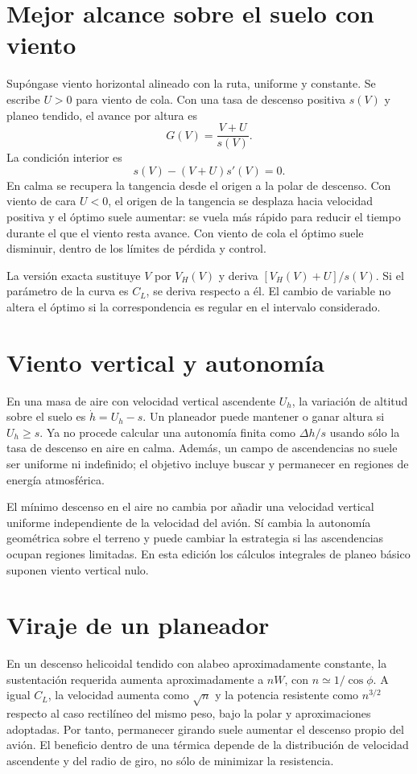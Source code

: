 \section{Mejor alcance sobre el suelo con viento}
Supóngase viento horizontal alineado con la ruta, uniforme y constante. Se escribe $U>0$ para viento de cola. Con una tasa de descenso positiva $s(V)$ y planeo tendido, el avance por altura es
\begin{equation}
G(V)=\frac{V+U}{s(V)}.
\end{equation}
La condición interior es
\begin{equation}
s(V)-(V+U)s'(V)=0.\label{eq:optimo-viento}
\end{equation}
En calma se recupera la tangencia desde el origen a la polar de descenso. Con viento de cara $U<0$, el origen de la tangencia se desplaza hacia velocidad positiva y el óptimo suele aumentar: se vuela más rápido para reducir el tiempo durante el que el viento resta avance. Con viento de cola el óptimo suele disminuir, dentro de los límites de pérdida y control.

La versión exacta sustituye $V$ por $V_H(V)$ y deriva $[V_H(V)+U]/s(V)$. Si el parámetro de la curva es $C_L$, se deriva respecto a él. El cambio de variable no altera el óptimo si la correspondencia es regular en el intervalo considerado.

\section{Viento vertical y autonomía}
En una masa de aire con velocidad vertical ascendente $U_h$, la variación de altitud sobre el suelo es $\dot h=U_h-s$. Un planeador puede mantener o ganar altura si $U_h\geq s$. Ya no procede calcular una autonomía finita como $\Delta h/s$ usando sólo la tasa de descenso en aire en calma. Además, un campo de ascendencias no suele ser uniforme ni indefinido; el objetivo incluye buscar y permanecer en regiones de energía atmosférica.

El mínimo descenso en el aire no cambia por añadir una velocidad vertical uniforme independiente de la velocidad del avión. Sí cambia la autonomía geométrica sobre el terreno y puede cambiar la estrategia si las ascendencias ocupan regiones limitadas. En esta edición los cálculos integrales de planeo básico suponen viento vertical nulo.

\section{Viraje de un planeador}
En un descenso helicoidal tendido con alabeo aproximadamente constante, la sustentación requerida aumenta aproximadamente a $nW$, con $n\simeq1/\cos\phi$. A igual $C_L$, la velocidad aumenta como $\sqrt n$ y la potencia resistente como $n^{3/2}$ respecto al caso rectilíneo del mismo peso, bajo la polar y aproximaciones adoptadas. Por tanto, permanecer girando suele aumentar el descenso propio del avión. El beneficio dentro de una térmica depende de la distribución de velocidad ascendente y del radio de giro, no sólo de minimizar la resistencia.

